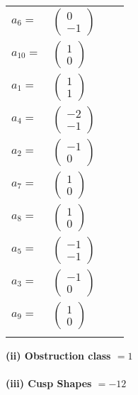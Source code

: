 \documentclass[1p]{elsarticle_modified}
\theoremstyle{definition}
\begin{document}
\begin{tabular}{m{7pt} m{180pt} m{7pt} m{180pt} }
\flushright $a_{6}=$&$\begin{pmatrix}0\\-1\end{pmatrix}$ \\
\flushright $a_{10}=$&$\begin{pmatrix}1\\0\end{pmatrix}$ \\
\flushright $a_{1}=$&$\begin{pmatrix}1\\1\end{pmatrix}$ \\
\flushright $a_{4}=$&$\begin{pmatrix}-2\\-1\end{pmatrix}$ \\
\flushright $a_{2}=$&$\begin{pmatrix}-1\\0\end{pmatrix}$ \\
\flushright $a_{7}=$&$\begin{pmatrix}1\\0\end{pmatrix}$ \\
\flushright $a_{8}=$&$\begin{pmatrix}1\\0\end{pmatrix}$ \\
\flushright $a_{5}=$&$\begin{pmatrix}-1\\-1\end{pmatrix}$ \\
\flushright $a_{3}=$&$\begin{pmatrix}-1\\0\end{pmatrix}$ \\
\flushright $a_{9}=$&$\begin{pmatrix}1\\0\end{pmatrix}$\\&\end{tabular}
\flushleft \textbf{(ii) Obstruction class $= 1$}\\~\\
\flushleft \textbf{(iii) Cusp Shapes $= -12$}\\~\\
\end{document}
